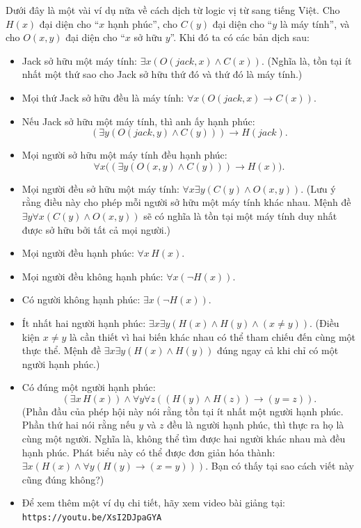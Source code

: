 \begin{notebox}
Dưới đây là một vài ví dụ nữa về cách dịch từ logic vị từ sang tiếng Việt. Cho $H(x)$ đại diện cho ``$x$ hạnh phúc'', cho $C(y)$ đại diện cho ``$y$ là máy tính'', và cho $O(x,y)$ đại diện cho ``$x$ sở hữu $y$''. Khi đó ta có các bản dịch sau:

\begin{itemize}
\item Jack sở hữu một máy tính: $\exists x(O(jack, x) \land C(x))$. (Nghĩa là, tồn tại ít nhất một thứ sao cho Jack sở hữu thứ đó và thứ đó là máy tính.)

\item Mọi thứ Jack sở hữu đều là máy tính: $\forall x(O(jack, x) \to C(x))$.

\item Nếu Jack sở hữu một máy tính, thì anh ấy hạnh phúc:
\[(\exists y(O(jack, y) \land C(y))) \to H(jack).\]

\item Mọi người sở hữu một máy tính đều hạnh phúc:
\[\forall x\big((\exists y(O(x,y) \land C(y))) \to H(x)\big).\]

\item Mọi người đều sở hữu một máy tính: $\forall x \exists y(C(y) \land O(x,y))$. (Lưu ý rằng điều này cho phép mỗi người sở hữu một máy tính khác nhau. Mệnh đề $\exists y \forall x(C(y) \land O(x,y))$ sẽ có nghĩa là tồn tại một máy tính duy nhất được sở hữu bởi tất cả mọi người.)

\item Mọi người đều hạnh phúc: $\forall x\, H(x)$.

\item Mọi người đều không hạnh phúc: $\forall x(\neg H(x))$.

\item Có người không hạnh phúc: $\exists x(\neg H(x))$.

\item Ít nhất hai người hạnh phúc: $\exists x \exists y(H(x) \land H(y) \land (x \neq y))$. (Điều kiện $x \neq y$ là cần thiết vì hai biến khác nhau có thể tham chiếu đến cùng một thực thể. Mệnh đề $\exists x \exists y(H(x) \land H(y))$ đúng ngay cả khi chỉ có một người hạnh phúc.)

\item Có đúng một người hạnh phúc:
\[(\exists x\, H(x)) \land \forall y \forall z((H(y) \land H(z)) \to (y = z)).\]
(Phần đầu của phép hội này nói rằng tồn tại ít nhất một người hạnh phúc. Phần thứ hai nói rằng nếu $y$ và $z$ đều là người hạnh phúc, thì thực ra họ là cùng một người. Nghĩa là, không thể tìm được hai người khác nhau mà đều hạnh phúc. Phát biểu này có thể được đơn giản hóa thành: $\exists x(H(x) \land \forall y(H(y) \to (x = y)))$. Bạn có thấy tại sao cách viết này cũng đúng không?)

\item Để xem thêm một ví dụ chi tiết, hãy xem video bài giảng tại: \texttt{https://youtu.be/XsI2DJpaGYA}
\end{itemize}
\end{notebox}


